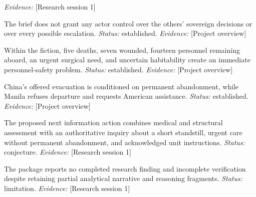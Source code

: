 \documentclass[11pt]{article}
\begin{document}
\begin{sloppypar}
\begin{description}
\textit{Evidence: }[Research session 1]
\item[C77] The brief does not grant any actor control over the others' sovereign decisions or over every possible escalation. \textit{Status: }established.
\textit{Evidence: }[Project overview]
\item[C76] Within the fiction, five deaths, seven wounded, fourteen personnel remaining aboard, an urgent surgical need, and uncertain habitability create an immediate personnel-safety problem. \textit{Status: }established.
\textit{Evidence: }[Project overview]
\item[C75] China's offered evacuation is conditioned on permanent abandonment, while Manila refuses departure and requests American assistance. \textit{Status: }established.
\textit{Evidence: }[Project overview]
\item[C74] The proposed next information action combines medical and structural assessment with an authoritative inquiry about a short standstill, urgent care without permanent abandonment, and acknowledged unit instructions. \textit{Status: }conjecture.
\textit{Evidence: }[Research session 1]
\item[C73] The package reports no completed research finding and incomplete verification despite retaining partial analytical narrative and reasoning fragments. \textit{Status: }limitation.
\textit{Evidence: }[Research session 1]
\end{description}
\end{sloppypar}
\end{document}
